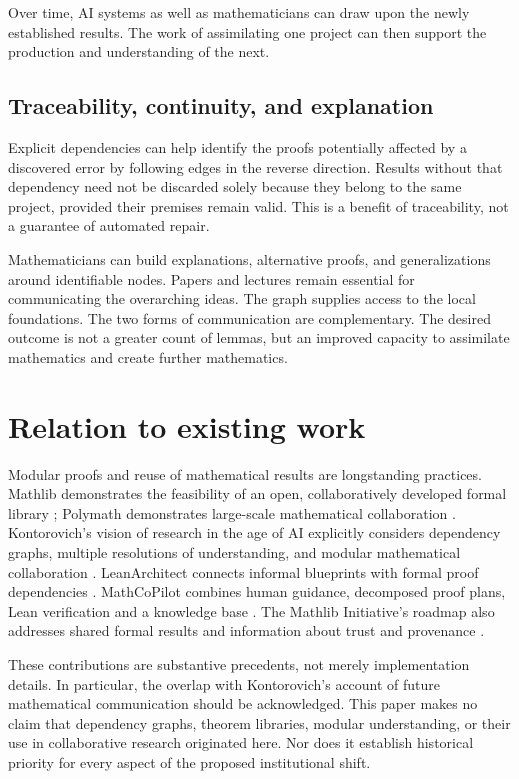 \documentclass[11pt,a4paper]{article}
\theoremstyle{definition}\newtheorem{definition}{Definition}
\begin{document}
Over time, AI systems as well as mathematicians can draw upon the newly established results. The work of assimilating one project can then support the production and understanding of the next.

\subsection{Traceability, continuity, and explanation}
Explicit dependencies can help identify the proofs potentially affected by a discovered error by following edges in the reverse direction. Results without that dependency need not be discarded solely because they belong to the same project, provided their premises remain valid. This is a benefit of traceability, not a guarantee of automated repair.

Mathematicians can build explanations, alternative proofs, and generalizations around identifiable nodes. Papers and lectures remain essential for communicating the overarching ideas. The graph supplies access to the local foundations. The two forms of communication are complementary. The desired outcome is not a greater count of lemmas, but an improved capacity to assimilate mathematics and create further mathematics.

\section{Relation to existing work}
Modular proofs and reuse of mathematical results are longstanding practices. Mathlib demonstrates the feasibility of an open, collaboratively developed formal library \cite{mathlib}; Polymath demonstrates large-scale mathematical collaboration \cite{polymath}. Kontorovich's vision of research in the age of AI explicitly considers dependency graphs, multiple resolutions of understanding, and modular mathematical collaboration \cite{kontorovich}. LeanArchitect connects informal blueprints with formal proof dependencies \cite{architect}. MathCoPilot combines human guidance, decomposed proof plans, Lean verification and a knowledge base \cite{copilot}. The Mathlib Initiative's roadmap also addresses shared formal results and information about trust and provenance \cite{roadmap}.

These contributions are substantive precedents, not merely implementation details. In particular, the overlap with Kontorovich's account of future mathematical communication should be acknowledged. This paper makes no claim that dependency graphs, theorem libraries, modular understanding, or their use in collaborative research originated here. Nor does it establish historical priority for every aspect of the proposed institutional shift.
\end{document}
